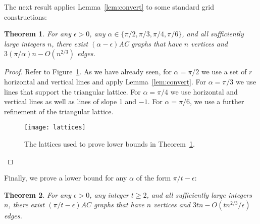 \documentclass{patmorin}
\newcommand{\figlabel}[1]{\label{fig:#1}}
\newcommand{\figref}[1]{\mbox{Figure~\ref{fig:#1}}}
\newtheorem{thm}{Theorem}
\newcommand{\thmref}[1]{Theorem~\ref{thm:#1}}
\newcommand{\lemref}[1]{Lemma~\ref{lem:#1}}
\begin{document}
The next result applies \lemref{convert} to some standard grid
constructions:

\begin{thm}\label{thm:finite}
For any $\epsilon>0$, any $\alpha\in\{\pi/2,\pi/3,\pi/4,\pi/6\}$, and
all sufficiently large integers $n$, there exist $(\alpha-\epsilon)$AC
graphs that have $n$ vertices and $3(\pi/\alpha)n - O(n^{2/3})$ edges.
\end{thm}

\begin{proof}
Refer to \figref{lattices}.
As we have already seen, for $\alpha=\pi/2$ we use a set of $r$ horizontal
and vertical lines and apply \lemref{convert}.  For $\alpha=\pi/3$ we use
lines that support the triangular lattice.  For $\alpha=\pi/4$ we use
horizontal and vertical lines as well as lines of slope 1 and $-1$. For
$\alpha=\pi/6$, we use a further refinement of the triangular lattice.
\begin{figure}
  \begin{center}
    \texttt{[image: lattices]}
  \end{center}
  \caption{The lattices used to prove lower bounds in \thmref{finite}.}
  \figlabel{lattices}
\end{figure}
\end{proof}

Finally, we prove a lower bound for any $\alpha$ of the form
$\pi/t-\epsilon$:
\begin{thm}
For any $\epsilon>0$, any integer $t\ge 2$, and all sufficiently large
integers $n$, there exist $(\pi/t-\epsilon)AC$ graphs that have $n$
vertices and $3tn - O(tn^{2/3}/\epsilon)$ edges.
\end{thm}
\end{document}
